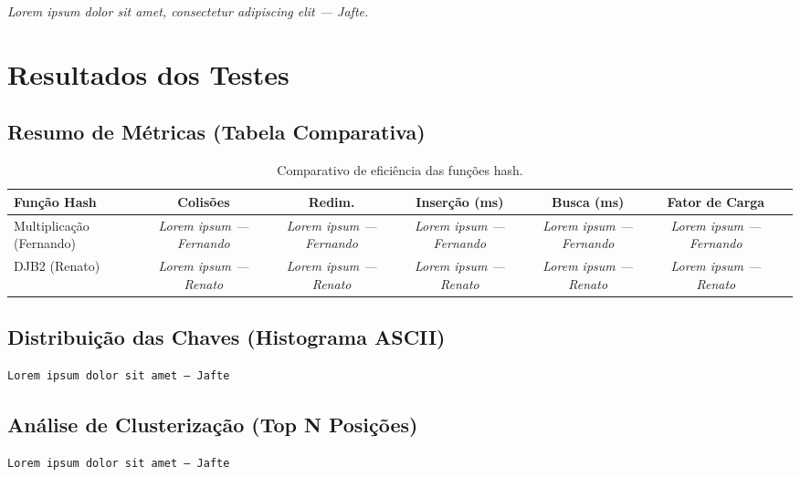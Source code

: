 \documentclass[12pt,a4paper]{abntex2}
\newcommand{\placeholderAluno}[1]{\textit{Lorem ipsum dolor sit amet, consectetur adipiscing elit — #1.}}
\begin{document}
\placeholderAluno{Jafte}

\section{Resultados dos Testes}

\subsection{Resumo de Métricas (Tabela Comparativa)}
\begin{table}[H]
\centering
\caption{Comparativo de eficiência das funções hash.}
\begin{tabular}{lcccccc}
\toprule
\textbf{Função Hash} & \textbf{Colisões} & \textbf{Redim.} & \textbf{Inserção (ms)} & \textbf{Busca (ms)} & \textbf{Fator de Carga} \\
\midrule
Multiplicação (Fernando) & \textit{Lorem ipsum — Fernando} & \textit{Lorem ipsum — Fernando} & \textit{Lorem ipsum — Fernando} & \textit{Lorem ipsum — Fernando} & \textit{Lorem ipsum — Fernando} \\
DJB2 (Renato)            & \textit{Lorem ipsum — Renato}   & \textit{Lorem ipsum — Renato}   & \textit{Lorem ipsum — Renato}   & \textit{Lorem ipsum — Renato}   & \textit{Lorem ipsum — Renato} \\
\bottomrule
\end{tabular}
\end{table}

\subsection{Distribuição das Chaves (Histograma ASCII)}
\begin{lstlisting}[style=console, caption={Distribuição das chaves por posição (hash 1 e/ou hash 2).}]
Lorem ipsum dolor sit amet — Jafte
\end{lstlisting}

\subsection{Análise de Clusterização (Top N Posições)}
\begin{lstlisting}[style=console, caption={Posições mais congestionadas (exemplo).}]
Lorem ipsum dolor sit amet — Jafte
\end{lstlisting}
\end{document}
